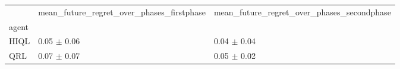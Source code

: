 \begin{tabular}{lll}
\toprule
 & mean_future_regret_over_phases_firstphase & mean_future_regret_over_phases_secondphase \\
agent &  &  \\
\midrule
HIQL & 0.05 $\pm$ 0.06 & 0.04 $\pm$ 0.04 \\
QRL & 0.07 $\pm$ 0.07 & 0.05 $\pm$ 0.02 \\
\bottomrule
\end{tabular}
